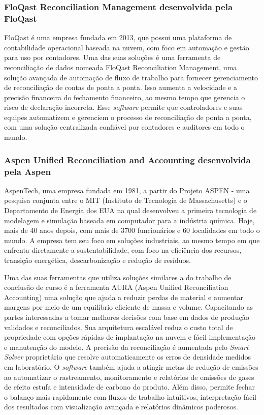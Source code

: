\subsubsection{FloQast Reconciliation Management desenvolvida pela FloQast}

FloQast é uma empresa fundada em 2013, que possui uma plataforma  de contabilidade operacional baseada na nuvem, com foco em automação e gestão para uso por contadores. Uma das suas soluções é uma ferramenta de reconciliação de dados nomeada FloQast Reconciliation Management, uma solução avançada de automação de fluxo de trabalho para fornecer gerenciamento de reconciliação de contas de ponta a ponta. Isso aumenta a velocidade e a precisão financeira do fechamento financeiro, ao mesmo tempo que gerencia o risco de declaração incorreta. Esse \textit{software} permite que controladores e suas equipes automatizem e gerenciem o processo de reconciliação de ponta a ponta, com uma solução centralizada confiável por contadores e auditores em todo o mundo.

\subsubsection{Aspen Unified Reconciliation and Accounting desenvolvida pela Aspen}

AspenTech, uma empresa fundada em 1981, a partir do Projeto ASPEN - uma pesquisa conjunta entre o MIT (Instituto de Tecnologia de Massachusetts) e o Departamento de Energia dos EUA na qual desenvolveu a primeira tecnologia de modelagem e simulação baseada em computador para a indústria química. Hoje, mais de 40 anos depois, com mais de 3700 funcionários e 60 localidades em todo o mundo. A empresa tem seu foco em soluções industriais, ao mesmo tempo em que enfrenta diretamente a sustentabilidade, com foco na eficiência dos recursos, transição energética, descarbonização e redução de resíduos.

Uma das suas ferramentas que utiliza soluções similares a do trabalho de conclusão de curso é a ferramenta AURA (Aspen Unified Reconciliation Accounting) uma solução que ajuda a reduzir perdas de material e aumentar margens por meio de um equilíbrio eficiente de massa e volume. Capacitando as partes interessadas a tomar melhores decisões com base em dados de produção validados e reconciliados. Sua arquitetura escalável reduz o custo total de propriedade com opções rápidas de implantação na nuvem e fácil implementação e manutenção do modelo. A precisão da reconciliação é aumentada pelo \textit{Smart Solver} proprietário que resolve automaticamente os erros de densidade medidos em laboratório. O \textit{software} também ajuda a atingir metas de redução de emissões ao automatizar o rastreamento, monitoramento e relatórios de emissões de gases de efeito estufa e intensidade de carbono do produto. Além disso, permite fechar o balanço mais rapidamente com fluxos de trabalho intuitivos, interpretação fácil dos resultados com visualização avançada e relatórios dinâmicos poderosos.

